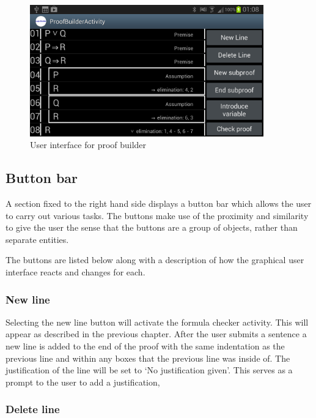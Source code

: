 \begin{figure}[h!]
\centering
\includegraphics[width=0.9\textwidth]{Images/sampleproof.png}
\caption{User interface for proof builder}
\label{fig:Compilation}
\end{figure}

\FloatBarrier




\subsection{Button bar}

A section fixed to the right hand side displays a button bar which allows the user to carry out various tasks. The buttons make use of the proximity and similarity to give the user the sense that the buttons are a group of objects, rather than separate entities. 

The buttons are listed below along with a description of how the graphical user interface reacts and changes for each.

\subsubsection{New line}

Selecting the new line button will activate the formula checker activity. This will appear as described in the previous chapter. After the user submits a sentence a new line is added to the end of the proof  with the same indentation as the previous line and within any boxes that the previous line was inside of. The justification of the line will be set to `No justification given'. This serves as a prompt to the user to add a justification,


\subsubsection*{Delete line}

